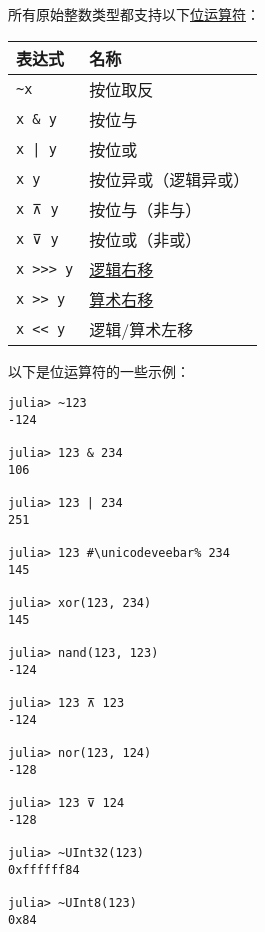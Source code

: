 所有原始整数类型都支持以下\href{https://en.wikipedia.org/wiki/Bitwise\_operation\#Bitwise\_operators}{位运算符}：




\begin{table}[h]

\begin{tabulary}{\linewidth}{|L|L|}
\hline
表达式 & 名称 \\
\hline
\texttt{{\textasciitilde}x} & 按位取反 \\
\hline
\texttt{x \& y} & 按位与 \\
\hline
\texttt{x | y} & 按位或 \\
\hline
\texttt{x \unicodeveebar{} y} & 按位异或（逻辑异或） \\
\hline
\texttt{x ⊼ y} & 按位与（非与） \\
\hline
\texttt{x ⊽ y} & 按位或（非或） \\
\hline
\texttt{x >>> y} & \href{https://en.wikipedia.org/wiki/Logical\_shift}{逻辑右移} \\
\hline
\texttt{x >> y} & \href{https://en.wikipedia.org/wiki/Arithmetic\_shift}{算术右移} \\
\hline
\texttt{x << y} & 逻辑/算术左移 \\
\hline
\end{tabulary}

\end{table}



以下是位运算符的一些示例：




\begin{verbatim}
julia> ~123
-124

julia> 123 & 234
106

julia> 123 | 234
251

julia> 123 #\unicodeveebar% 234
145

julia> xor(123, 234)
145

julia> nand(123, 123)
-124

julia> 123 ⊼ 123
-124

julia> nor(123, 124)
-128

julia> 123 ⊽ 124
-128

julia> ~UInt32(123)
0xffffff84

julia> ~UInt8(123)
0x84
\end{verbatim}



\hypertarget{11524779735284405729}{}


